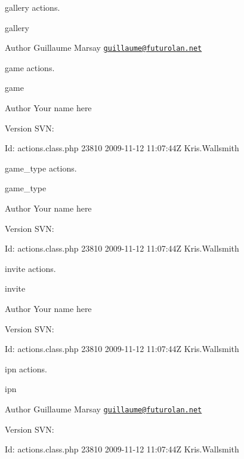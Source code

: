 gallery actions.

gallery \begin{DoxyAuthor}{Author}
Guillaume Marsay \href{mailto:guillaume@futurolan.net}{\tt guillaume@futurolan.\-net}
\end{DoxyAuthor}
game actions.

game \begin{DoxyAuthor}{Author}
Your name here 
\end{DoxyAuthor}
\begin{DoxyVersion}{Version}
S\-V\-N\-: 
\end{DoxyVersion}
\begin{DoxyParagraph}{Id\-:}
actions.\-class.\-php 23810 2009-\/11-\/12 11\-:07\-:44\-Z Kris.\-Wallsmith 
\end{DoxyParagraph}


game\-\_\-type actions.

game\-\_\-type \begin{DoxyAuthor}{Author}
Your name here 
\end{DoxyAuthor}
\begin{DoxyVersion}{Version}
S\-V\-N\-: 
\end{DoxyVersion}
\begin{DoxyParagraph}{Id\-:}
actions.\-class.\-php 23810 2009-\/11-\/12 11\-:07\-:44\-Z Kris.\-Wallsmith 
\end{DoxyParagraph}


invite actions.

invite \begin{DoxyAuthor}{Author}
Your name here 
\end{DoxyAuthor}
\begin{DoxyVersion}{Version}
S\-V\-N\-: 
\end{DoxyVersion}
\begin{DoxyParagraph}{Id\-:}
actions.\-class.\-php 23810 2009-\/11-\/12 11\-:07\-:44\-Z Kris.\-Wallsmith 
\end{DoxyParagraph}


ipn actions.

ipn \begin{DoxyAuthor}{Author}
Guillaume Marsay \href{mailto:guillaume@futurolan.net}{\tt guillaume@futurolan.\-net} 
\end{DoxyAuthor}
\begin{DoxyVersion}{Version}
S\-V\-N\-: 
\end{DoxyVersion}
\begin{DoxyParagraph}{Id\-:}
actions.\-class.\-php 23810 2009-\/11-\/12 11\-:07\-:44\-Z Kris.\-Wallsmith 
\end{DoxyParagraph}



